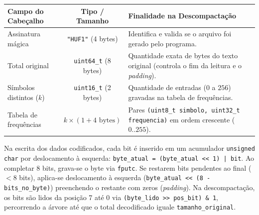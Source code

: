 \documentclass[a4paper,10pt]{article}
\begin{document}
\begin{table}[h!]
\centering
\small
\begin{tabularx}{\textwidth}{|l|c|X|}
\hline
\textbf{Campo do Cabeçalho} & \textbf{Tipo / Tamanho} & \textbf{Finalidade na Descompactação} \\
\hline
Assinatura mágica & \texttt{"HUF1"} (4 bytes) & Identifica e valida se o arquivo foi gerado pelo programa. \\
\hline
Total original & \texttt{uint64\_t} (8 bytes) & Quantidade exata de bytes do texto original (controla o fim da leitura e o \emph{padding}). \\
\hline
Símbolos distintos ($k$) & \texttt{uint16\_t} (2 bytes) & Quantidade de entradas ($0$ a $256$) gravadas na tabela de frequências. \\
\hline
Tabela de frequências & $k \times (1 + 4\textrm{ bytes})$ & Pares \texttt{(uint8\_t simbolo, uint32\_t frequencia)} em ordem crescente ($0..255$). \\
\hline
\end{tabularx}
\end{table}
\vspace{-3pt}

Na escrita dos dados codificados, cada bit é inserido em um acumulador \texttt{unsigned char} por deslocamento à esquerda: \texttt{byte\_atual = (byte\_atual <{}< 1) | bit}. Ao completar 8 bits, grava-se o byte via \texttt{fputc}. Se restarem bits pendentes ao final ($< 8$ bits), aplica-se deslocamento à esquerda (\texttt{byte\_atual <{}< (8 - bits\_no\_byte)}) preenchendo o restante com zeros (\emph{padding}). Na descompactação, os bits são lidos da posição 7 até 0 via \texttt{(byte\_lido >{}> pos\_bit) \& 1}, percorrendo a árvore até que o total decodificado iguale \texttt{tamanho\_original}.
\end{document}

